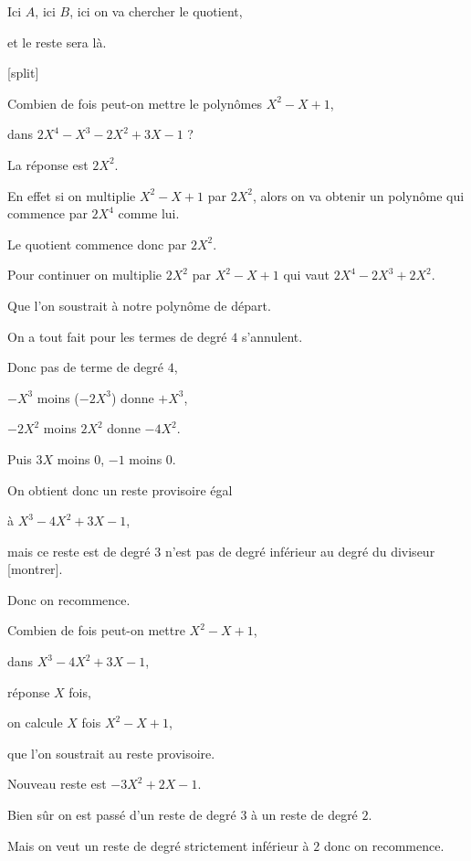 Ici $A$, ici $B$, ici on va chercher le quotient,

et le reste sera là.

[split]

Combien de fois peut-on mettre le polynômes $X^2-X+1$,

dans $2X^4-X^3-2X^2+3X-1$ ?

\change

La réponse est $2X^2$.

En effet si on multiplie $X^2-X+1$ par $2X^2$, alors on va obtenir un polynôme
qui commence par $2X^4$ comme lui.

Le quotient commence donc par $2X^2$.

\change

Pour continuer on multiplie $2X^2$ par $X^2-X+1$ qui vaut $2X^4-2X^3+2X^2$.

\change

Que l'on soustrait à notre polynôme de départ.

On a tout fait pour les termes de degré $4$ s'annulent.

\change

Donc pas de terme de degré $4$,

$-X^3$ moins ($-2X^3$) donne $+X^3$,

$-2X^2$ moins $2X^2$ donne $-4X^2$.

Puis $3X$ moins $0$, $-1$ moins $0$.

On obtient donc un reste provisoire égal

à $X^3-4X^2+3X-1$,

mais ce reste est de degré $3$ n'est pas de degré inférieur au degré du diviseur [montrer].

Donc on recommence.

Combien de fois peut-on mettre  $X^2-X+1$,

dans $X^3-4X^2+3X-1$,

réponse $X$ fois,

\change

on calcule $X$ fois $X^2-X+1$,

\change

que l'on soustrait au reste provisoire.

\change


Nouveau reste est $-3X^2 +2X - 1$.

Bien sûr on est passé d'un reste de degré $3$ à un reste de degré $2$.

Mais on veut un reste de degré strictement inférieur à $2$ donc on recommence.


